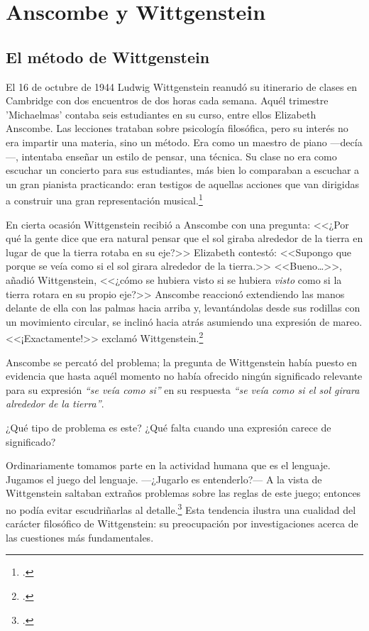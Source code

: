 \section{Anscombe y Wittgenstein}

\subsection{El método de Wittgenstein}
El 16 de octubre de 1944 Ludwig Wittgenstein reanudó su itinerario de clases en
Cambridge con dos encuentros de dos horas cada semana. Aquél trimestre
'Michaelmas' contaba seis estudiantes en su curso, entre ellos Elizabeth
Anscombe. Las lecciones trataban sobre psicología filosófica, pero su interés no
era impartir una materia, sino un método. Era como un maestro de piano
---decía---, intentaba enseñar un estilo de pensar, una técnica. Su clase no era
como escuchar un concierto para sus estudiantes, más bien lo comparaban a
escuchar a un gran pianista practicando: eran testigos de aquellas acciones que
van dirigidas a construir una gran representación
musical.\footcite[p.~357]{pubnpriv}
 
En cierta ocasión Wittgenstein recibió a Anscombe con una pregunta: <<¿Por qué la
gente dice que era natural pensar que el sol giraba alrededor de la tierra en
lugar de que la tierra rotaba en su eje?>> Elizabeth contestó: <<Supongo que
porque se veía como si el sol girara alrededor de la tierra.>> <<Bueno\ldots>>,
añadió Wittgenstein, <<¿cómo se hubiera visto si se hubiera \emph{visto} como si
la tierra rotara en su propio eje?>> Anscombe reaccionó extendiendo las manos
delante de ella con las palmas hacia arriba y, levantándolas desde sus rodillas
con un movimiento circular, se inclinó hacia atrás asumiendo una expresión de
mareo. <<¡Exactamente!>> exclamó Wittgenstein.\footcite[cf.~][p.~151]{IWT}

Anscombe se percató del problema; la pregunta de Wittgenstein había puesto en
evidencia que hasta aquél momento no había ofrecido ningún significado relevante
para su expresión \emph{``se veía como si''} en su respuesta \emph{``se veía
    como si el sol girara alrededor de la tierra''}. 
 
¿Qué tipo de problema es este? 
¿Qué falta cuando una expresión carece de significado?

Ordinariamente tomamos parte en la actividad humana que es el
lenguaje. Jugamos el juego del lenguaje. ---¿Jugarlo es entenderlo?--- 
A la vista de Wittgenstein saltaban extraños problemas sobre las reglas de este
juego; entonces no podía evitar escudriñarlas al
detalle.\footcite[cf.~][loc.7099]{monk} 
Esta tendencia ilustra una cualidad del carácter filosófico de Wittgenstein: su
preocupación por investigaciones acerca de las cuestiones más fundamentales. 


